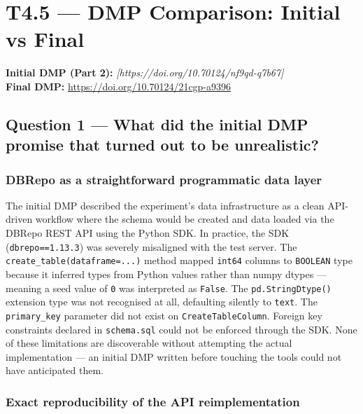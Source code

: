\section*{T4.5 — DMP Comparison: Initial vs Final}

\noindent\textbf{Initial DMP (Part 2):} \textit{[https://doi.org/10.70124/nf9qd-q7b67]}\\
\textbf{Final DMP:} \url{https://doi.org/10.70124/21cgp-a9396}

\bigskip

\subsection*{Question 1 — What did the initial DMP promise that turned out to be unrealistic?}

\subsubsection*{DBRepo as a straightforward programmatic data layer}

The initial DMP described the experiment's data infrastructure as a clean API-driven
workflow where the schema would be created and data loaded via the DBRepo REST API
using the Python SDK. In practice, the SDK (\texttt{dbrepo==1.13.3}) was severely
misaligned with the test server. The \texttt{create\_table(dataframe=...)} method
mapped \texttt{int64} columns to \texttt{BOOLEAN} type because it inferred types from
Python values rather than numpy dtypes --- meaning a seed value of \texttt{0} was
interpreted as \texttt{False}. The \texttt{pd.StringDtype()} extension type was not
recognised at all, defaulting silently to \texttt{text}. The \texttt{primary\_key}
parameter did not exist on \texttt{CreateTableColumn}. Foreign key constraints declared
in \texttt{schema.sql} could not be enforced through the SDK. None of these limitations
are discoverable without attempting the actual implementation --- an initial DMP written
before touching the tools could not have anticipated them.

\subsubsection*{Exact reproducibility of the API reimplementation}

